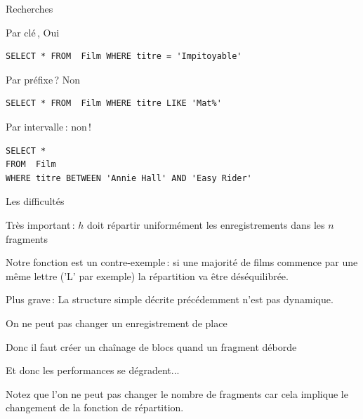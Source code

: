 \begin{frame}[fragile]{Recherches}

\begin{redbullet}
  \item Par clé\,, Oui
  
 
\begin{verbatim}
SELECT * FROM  Film WHERE titre = 'Impitoyable'
\end{verbatim}
 
   \item Par préfixe\,? Non

\begin{verbatim}
SELECT * FROM  Film WHERE titre LIKE 'Mat%'
\end{verbatim}
 
   \item Par intervalle\,: non\,!

\begin{verbatim}
SELECT *
FROM  Film
WHERE titre BETWEEN 'Annie Hall' AND 'Easy Rider'
\end{verbatim}
 
\end{redbullet}

\end{frame}
\begin{frame}{Les difficultés}


Très important\,: $h$ doit répartir uniformément les enregistrements
            dans les $n$ fragments
            
\vfill

Notre fonction est un contre-exemple\,: si une majorité de films commence par une
même lettre ('L' par exemple) la répartition va être déséquilibrée.

\vfill

\alert{Plus grave}\,: La structure simple décrite précédemment n'est pas
\alert{dynamique}.

\begin{redbullet}
  \item On ne peut pas changer un enregistrement de place

   \item Donc  il faut créer un chaînage de blocs quand
             un fragment déborde

  \item Et donc les performances se dégradent...
\end{redbullet}

\vfill

\begin{blocgauche}
Notez que l'on ne peut pas changer le nombre de fragments
car cela implique le changement de la fonction de répartition. 
\end{blocgauche}
\end{frame}
